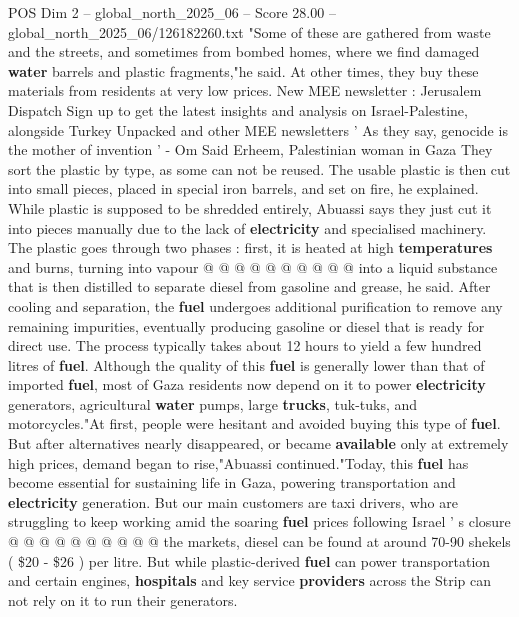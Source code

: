 \begin{textsample}{POS Dim 2 – global\_north\_2025\_06 – Score 28.00 – global\_north\_2025\_06/126182260.txt}  \label{ex:f2_pos_225}
"Some of these are gathered from waste and the streets, and sometimes from bombed homes, where we find damaged \textbf{water} barrels and plastic fragments,"he said.
At other times, they buy these materials from residents at very low prices.
New MEE newsletter : Jerusalem Dispatch Sign up to get the latest insights and analysis on Israel-Palestine, alongside Turkey Unpacked and other MEE newsletters ' As they say, genocide is the mother of invention ' - Om Said Erheem, Palestinian woman in Gaza They sort the plastic by type, as some can not be reused.
The usable plastic is then cut into small pieces, placed in special iron barrels, and set on fire, he explained.
While plastic is supposed to be shredded entirely, Abuassi says they just cut it into pieces manually due to the lack of \textbf{electricity} and specialised machinery.
The plastic goes through two phases : first, it is heated at high \textbf{temperatures} and burns, turning into vapour @ @ @ @ @ @ @ @ @ @ into a liquid substance that is then distilled to separate diesel from gasoline and grease, he said.
After cooling and separation, the \textbf{fuel} undergoes additional purification to remove any remaining impurities, eventually producing gasoline or diesel that is ready for direct use.
The process typically takes about 12 hours to yield a few hundred litres of \textbf{fuel}.
Although the quality of this \textbf{fuel} is generally lower than that of imported \textbf{fuel}, most of Gaza residents now depend on it to power \textbf{electricity} generators, agricultural \textbf{water} pumps, large \textbf{trucks}, tuk-tuks, and motorcycles."At first, people were hesitant and avoided buying this type of \textbf{fuel}.
But after alternatives nearly disappeared, or became \textbf{available} only at extremely high prices, demand began to rise,"Abuassi continued."Today, this \textbf{fuel} has become essential for sustaining life in Gaza, powering transportation and \textbf{electricity} generation.
But our main customers are taxi drivers, who are struggling to keep working amid the soaring \textbf{fuel} prices following Israel ' s closure @ @ @ @ @ @ @ @ @ @ the markets, diesel can be found at around 70-90 shekels ( \$20 - \$26 ) per litre.
But while plastic-derived \textbf{fuel} can power transportation and certain engines, \textbf{hospitals} and key service \textbf{providers} across the Strip can not rely on it to run their generators.

\end{textsample}
